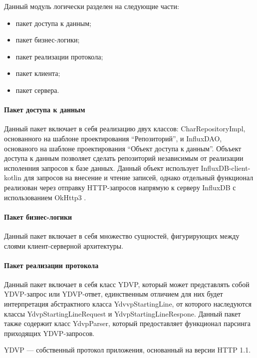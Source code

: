 Данный модуль логически разделен на следующие части:

\begin{itemize}[leftmargin=1.6\parindent]
\item пакет доступа к данным;
\item пакет бизнес-логики;
\item пакет реализации протокола;
\item пакет клиента;
\item пакет сервера.
\end{itemize}

\paragraph{Пакет доступа к данным \newline}
Данный пакет включает в себя реализацию двух классов: CharRepositoryImpl, основанного на шаблоне проектирования ``Репозиторий'', и InfluxDAO, основаного на шаблоне проектирования ``Объект доступа к данным''. Объъект доступа к данным позволяет сделать репозиторий независимым от реализации исполенния запросов к базе данных. Данный объект использует InfluxDB-client-kotlin \cite{influxClientKotlin} для запросов на внесение и чтение записей, однако отдельный функционал реализован через отправку HTTP-запросов напрямую к серверу InfluxDB с использованием OkHttp3 \cite{OkHttp}.

\paragraph{Пакет бизнес-логики \newline}
Данный пакет включает в себя множество сущностей, фигурирующих между слоями клиент-серверной архитектуры.

\paragraph{Пакет реализации протокола \newline}
Данный пакет включает в себя класс YDVP, который может представлять собой YDVP-запрос или YDVP-ответ, единственным отличием для них будет интерпретация абстрактного класса YdvvpStartingLine, от которого наследуются классы YdvpStartingLineRequest и YdvpStartingLineRespone. Данный пакет также содержит класс YdvpParser, который предоставляет функционал парсинга приходящих YDVP-запросов.

YDVP --- собственный протокол приложения, основанный на версии HTTP 1.1.

